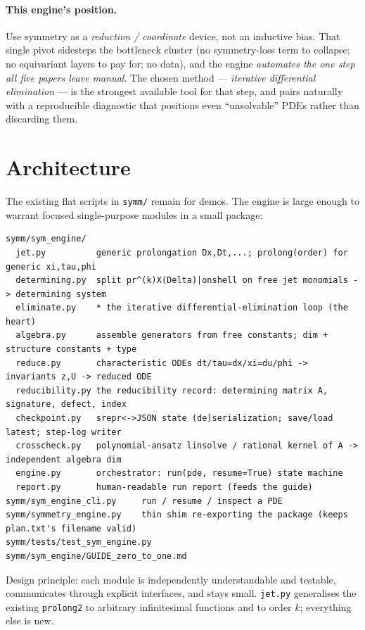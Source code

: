 \documentclass[11pt]{article}
\theoremstyle{definition}
\theoremstyle{remark}
\begin{document}
\paragraph{This engine's position.} Use symmetry as a \emph{reduction / coordinate} device, not an
inductive bias. That single pivot sidesteps the bottleneck cluster (no symmetry-loss term to
collapse; no equivariant layers to pay for; no data), and the engine \emph{automates the one step
all five papers leave manual}. The chosen method --- \emph{iterative differential elimination} --- is
the strongest available tool for that step, and pairs naturally with a reproducible diagnostic that
positions even ``unsolvable'' PDEs rather than discarding them.

\section{Architecture}

The existing flat scripts in \texttt{symm/} remain for demos. The engine is large enough to warrant
focused single-purpose modules in a small package:

\begin{verbatim}
symm/sym_engine/
  jet.py          generic prolongation Dx,Dt,...; prolong(order) for generic xi,tau,phi
  determining.py  split pr^(k)X(Delta)|onshell on free jet monomials -> determining system
  eliminate.py    * the iterative differential-elimination loop (the heart)
  algebra.py      assemble generators from free constants; dim + structure constants + type
  reduce.py       characteristic ODEs dt/tau=dx/xi=du/phi -> invariants z,U -> reduced ODE
  reducibility.py the reducibility record: determining matrix A, signature, defect, index
  checkpoint.py   srepr<->JSON state (de)serialization; save/load latest; step-log writer
  crosscheck.py   polynomial-ansatz linsolve / rational kernel of A -> independent algebra dim
  engine.py       orchestrator: run(pde, resume=True) state machine
  report.py       human-readable run report (feeds the guide)
symm/sym_engine_cli.py     run / resume / inspect a PDE
symm/symmetry_engine.py    thin shim re-exporting the package (keeps plan.txt's filename valid)
symm/tests/test_sym_engine.py
symm/sym_engine/GUIDE_zero_to_one.md
\end{verbatim}

Design principle: each module is independently understandable and testable, communicates through
explicit interfaces, and stays small. \texttt{jet.py} generalises the existing \texttt{prolong2} to
arbitrary infinitesimal functions and to order $k$; everything else is new.
\end{document}
